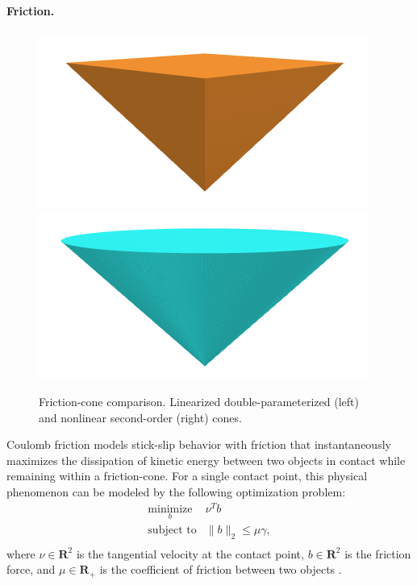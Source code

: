 \paragraph{Friction.} 
\begin{figure}[t]
	\centering
	\includegraphics[width=0.25\columnwidth]{dojo/linearized_cone.png}
	\includegraphics[width=0.25\columnwidth]{dojo/nonlinear_cone.png}
	\hfill
	\caption[Linearized and second-order friction-cone comparison]{Friction-cone comparison. Linearized double-parameterized (left) and nonlinear second-order (right) cones.}
	\label{intro_friction_cone_comparison}
\end{figure}
Coulomb friction \cite{moreau2011unilateral} models stick-slip behavior with friction that instantaneously maximizes the dissipation of kinetic energy between two objects in contact while remaining within a friction-cone. For a single contact point, this physical phenomenon can be modeled by the following optimization problem:
\begin{equation}
	\begin{array}{ll}
		\underset{b}{\mbox{minimize}} & \nu^T b\\
		\mbox{subject to} &\|b\|_2\leq \mu \gamma, \\
	\end{array} \label{intro_mdp}
\end{equation}
where $\nu \in \mathbf{R}^{2}$ is the tangential velocity at the contact point, $b \in \mathbf{R}^2$ is the friction force, and $\mu \in \mathbf{R}_{+}$ is the coefficient of friction between two objects \cite{moreau2011unilateral}. 

